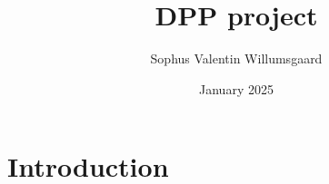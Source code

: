 \documentclass{article}
\title{DPP project}
\author{Sophus Valentin Willumsgaard}
\date{January 2025}
\begin{document}
\maketitle

\section{Introduction}
\end{document}
